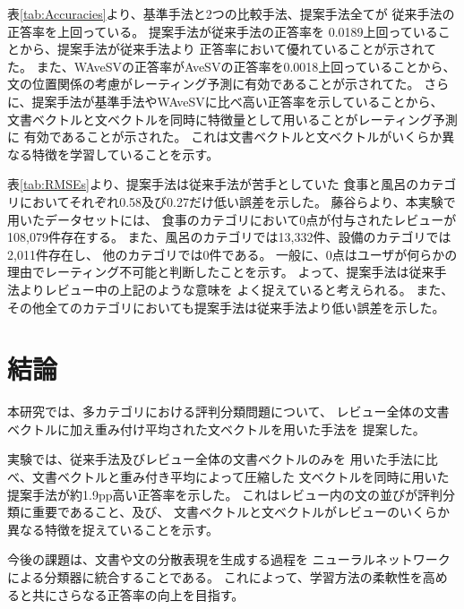 \documentclass[twocolumn,a4paper]{ltjarticle}
\begin{document}
表\ref{tab:Accuracies}より、基準手法と2つの比較手法、提案手法全てが
従来手法の正答率を上回っている。
提案手法が従来手法\cite{fujitani15}の正答率を
0.0189上回っていることから、提案手法が従来手法\cite{fujitani15}より
正答率において優れていることが示されてた。
また、WAveSVの正答率がAveSVの正答率を0.0018上回っていることから、
文の位置関係の考慮がレーティング予測に有効であることが示されてた。
さらに、提案手法が基準手法やWAveSVに比べ高い正答率を示していることから、
文書ベクトルと文ベクトルを同時に特徴量として用いることがレーティング予測に
有効であることが示された。
これは文書ベクトルと文ベクトルがいくらか異なる特徴を学習していることを示す。

表\ref{tab:RMSEs}より、提案手法は従来手法\cite{fujitani15}が苦手としていた
食事と風呂のカテゴリにおいてそれぞれ0.58及び0.27だけ低い誤差を示した。
藤谷ら\cite{fujitani15}より、本実験で用いたデータセットには、
食事のカテゴリにおいて0点が付与されたレビューが108,079件存在する。
また、風呂のカテゴリでは13,332件、設備のカテゴリでは2,011件存在し、
他のカテゴリでは0件である。
一般に、0点はユーザが何らかの理由でレーティング不可能と判断したことを示す。
よって、提案手法は従来手法\cite{fujitani15}よりレビュー中の上記のような意味を
よく捉えていると考えられる。
また、その他全てのカテゴリにおいても提案手法は従来手法より低い誤差を示した。



\section{結論}

本研究では、多カテゴリにおける評判分類問題について、
レビュー全体の文書ベクトルに加え重み付け平均された文ベクトルを用いた手法を
提案した。

実験では、従来手法\cite{fujitani15}及びレビュー全体の文書ベクトルのみを
用いた手法に比べ、文書ベクトルと重み付き平均によって圧縮した
文ベクトルを同時に用いた提案手法が約1.9pp高い正答率を示した。
これはレビュー内の文の並びが評判分類に重要であること、及び、
文書ベクトルと文ベクトルがレビューのいくらか異なる特徴を捉えていることを示す。

今後の課題は、文書や文の分散表現を生成する過程を
ニューラルネットワークによる分類器に統合することである。
これによって、学習方法の柔軟性を高めると共にさらなる正答率の向上を目指す。

%
%
\end{document}
